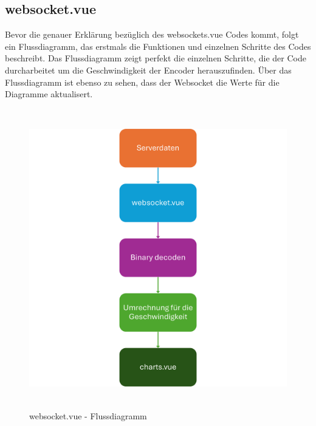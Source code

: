 \subsection{websocket.vue}
\label{subsec:frontend_websocket.vue}

Bevor die genauer Erklärung bezüglich des websockets.vue Codes kommt,
folgt ein Flussdiagramm, das erstmals die Funktionen und einzelnen Schritte
des Codes beschreibt.
%
Das Flussdiagramm zeigt perfekt die einzelnen Schritte, 
die der Code durcharbeitet um die Geschwindigkeit der Encoder herauszufinden.
Über das Flussdiagramm ist ebenso zu sehen, 
dass der Websocket die Werte für die Diagramme aktualisert. 
%

\begin{figure}[H]
  \includegraphics[width=\textwidth, height=13cm, center]{img/Websocket_FD.png}
  \caption{websocket.vue - Flussdiagramm}
  \label{fig:websocket_Flowchart}
\end{figure}

